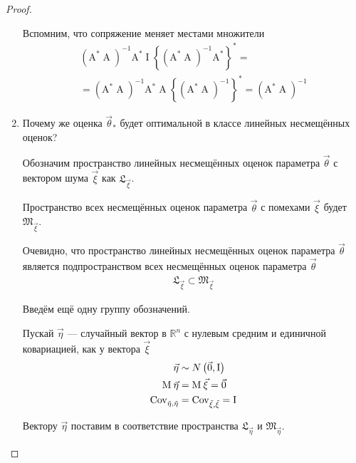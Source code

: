 \begin{proof}
\begin{enumerate}
      Вспомним, что сопряжение меняет местами множители
      \begin{align*}
          \left( \operatorname{A^*} \operatorname{A} \right)^{-1}
        \operatorname{A^*} \operatorname{I} \left\{
            \left( \operatorname{A^*} \operatorname{A} \right)^{-1}
        \operatorname{A^*} \right\}^* = \\
          = \left( \operatorname{A^*} \operatorname{A} \right)^{-1}
        \operatorname{A^*} \operatorname{A}
        \left\{ \left( \operatorname{A^*} \operatorname{A}
            \right)^{-1} \right\}^*
          = \left( \operatorname{A^*} \operatorname{A} \right)^{-1}
      \end{align*}

      \item Почему же оценка $\vec{\theta}_*$ будет оптимальной в классе
      линейных несмещённых оценок?

      Обозначим пространство линейных несмещённых оценок параметра
      $\vec{\theta}$ с вектором шума $\vec{\xi}$ как
      $\mathfrak{L}_{\vec{\xi}}$.

      Пространство всех несмещённых оценок параметра $\vec{\theta}$ с
      помехами $\vec{\xi}$ будет $\mathfrak{M}_{\vec{\xi}}$.

      Очевидно, что пространство линейных несмещённых оценок параметра
      $\vec{\theta}$ является подпространством всех несмещённых оценок
      параметра $\vec{\theta}$
      \begin{align*}
          \mathfrak{L}_{\vec{\xi}} \subset \mathfrak{M}_{\vec{\xi}}
      \end{align*}

      Введём ещё одну группу обозначений.

      Пускай $\vec{\eta}$ --- случайный вектор в $\mathbb{R}^n$ с нулевым
      средним и единичной ковариацией, как у вектора $\vec{\xi}$
      \begin{align*}
          \vec{\eta} &\sim N\left( \vec{0}, \operatorname{I} \right) \\
          \operatorname{M}_{} \vec{\eta} &= \operatorname{M}_{} \vec{\xi} = \vec{0} \\
          \operatorname{Cov^{}_{\vec{\eta}, \vec{\eta}}} &= \operatorname{Cov^{}_{\vec{\xi}, \vec{\xi}}} = \operatorname{I}
      \end{align*}

      Вектору $\vec{\eta}$ поставим в соответствие пространства
      $\mathfrak{L}_{\vec{\eta}}$ и $\mathfrak{M}_{\vec{\eta}}$.


\end{enumerate}
\end{proof}
